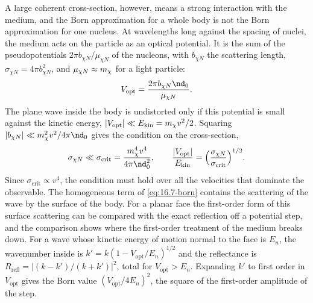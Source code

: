 A large coherent cross-section, however, means a strong interaction with the medium, and the Born approximation for a whole body is not the Born approximation for one nucleus. At wavelengths long against the spacing of nuclei, the medium acts on the particle as an optical potential. It is the sum of the pseudopotentials $2\pi b_{\chi N}/\mu_{\chi N}$ of the nucleons, with $b_{\chi N}$ the scattering length, $\sigma_{\chi N} = 4\pi b_{\chi N}^2$, and $\mu_{\chi N} \approx m_{\chi}$ for a light particle:
\begin{equation}
  V_{\mathrm{opt}} = \frac{2\pi b_{\chi N}\nd_0}{\mu_{\chi N}} .
  \label{eq:16.7-Vopt}
\end{equation}
The plane wave inside the body is undistorted only if this potential is small against the kinetic energy, $|V_{\mathrm{opt}}| \ll E_{\mathrm{kin}} = m_{\chi} v^2/2$. Squaring $|b_{\chi N}| \ll \mchi^2v^2/4\pi\nd_0$ gives the condition on the cross-section,
\begin{equation}
  \sigma_{\chi N} \ll \sigma_{\mathrm{crit}} = \frac{\mchi^4v^4}{4\pi\nd_0^2} ,
  \qquad \frac{|V_{\mathrm{opt}}|}{E_{\mathrm{kin}}} = \Bigl(\frac{\sigma_{\chi N}}{\sigma_{\mathrm{crit}}}\Bigr)^{1/2} .
  \label{eq:16.7-scrit}
\end{equation}
Since $\sigma_{\mathrm{crit}} \propto v^4$, the condition must hold over all the velocities that dominate the observable. The homogeneous term of \cref{eq:16.7-born} contains the scattering of the wave by the surface of the body. For a planar face the first-order form of this surface scattering can be compared with the exact reflection off a potential step, and the comparison shows where the first-order treatment of the medium breaks down. For a wave whose kinetic energy of motion normal to the face is $E_n$, the wavenumber inside is $k' = k(1 - V_{\mathrm{opt}}/E_n)^{1/2}$ and the reflectance is $R_{\mathrm{refl}} = |(k - k')/(k + k')|^2$, total for $V_{\mathrm{opt}} > E_n$. Expanding $k'$ to first order in $V_{\mathrm{opt}}$ gives the Born value $(V_{\mathrm{opt}}/4E_n)^2$, the square of the first-order amplitude of the step.

